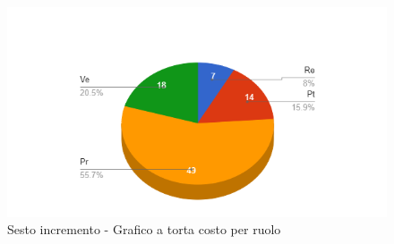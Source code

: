 {{\begin{longtable}{C{.4\freewidth} C{.2\freewidth} C{.2\freewidth} C{.2\freewidth} C{.2\freewidth} C{.2\freewidth} C{.2\freewidth} C{.2\freewidth} C{.2\freewidth}}
        \end{longtable}
        \begin{figure}[H]
          \includegraphics[width=15cm]{sezioni/Images/sestoT.png}
          \centering
          \caption{Sesto incremento - Grafico a torta costo per ruolo}
       \end{figure}
    }
    }

